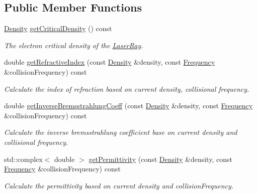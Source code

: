\subsection*{Public Member Functions}
\begin{DoxyCompactItemize}
\item 
\mbox{\label{classraytracer_1_1LaserRay_ac7ca600dec49c7d782e18bbba144e483}} 
\hyperlink{structraytracer_1_1Density}{Density} \hyperlink{classraytracer_1_1LaserRay_ac7ca600dec49c7d782e18bbba144e483}{get\+Critical\+Density} () const
\begin{DoxyCompactList}\small\item\em The electron critical density of the \hyperlink{classraytracer_1_1LaserRay}{Laser\+Ray}. \end{DoxyCompactList}\item 
double \hyperlink{classraytracer_1_1LaserRay_af841f0b8279f67242414c1709ce61212}{get\+Refractive\+Index} (const \hyperlink{structraytracer_1_1Density}{Density} \&density, const \hyperlink{structraytracer_1_1Frequency}{Frequency} \&collision\+Frequency) const
\begin{DoxyCompactList}\small\item\em Calculate the index of refraction based on current density, collisional frequency. \end{DoxyCompactList}\item 
double \hyperlink{classraytracer_1_1LaserRay_a9b73d2d5488310646ad750243f5e6b13}{get\+Inverse\+Bremsstrahlung\+Coeff} (const \hyperlink{structraytracer_1_1Density}{Density} \&density, const \hyperlink{structraytracer_1_1Frequency}{Frequency} \&collision\+Frequency) const
\begin{DoxyCompactList}\small\item\em Calculate the inverse bremsstrahlung coefficient base on current density and collisional frequency. \end{DoxyCompactList}\item 
std\+::complex$<$ double $>$ \hyperlink{classraytracer_1_1LaserRay_a7ab8b571769cf7bd6d9d71694db025aa}{get\+Permittivity} (const \hyperlink{structraytracer_1_1Density}{Density} \&density, const \hyperlink{structraytracer_1_1Frequency}{Frequency} \&collision\+Frequency) const
\begin{DoxyCompactList}\small\item\em Calculate the permittivity based on current density and collision\+Frequency. \end{DoxyCompactList}\item 

\end{DoxyCompactItemize}
